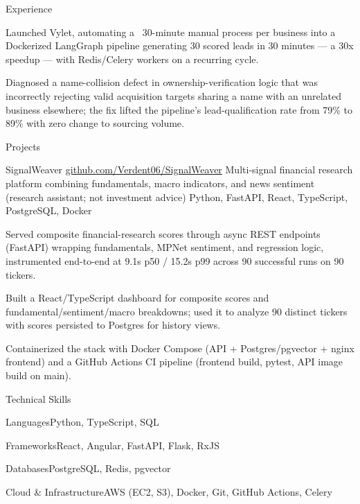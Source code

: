 \documentclass[
	11pt
]{../../../template}
\begin{document}
\begin{rSection}{E}{xperience}
\begin{rSectionEntry}
			\item Launched Vylet, automating a ~30-minute manual process per business into a Dockerized LangGraph pipeline generating 30 scored leads in 30 minutes --- a 30x speedup --- with Redis/Celery workers on a recurring cycle.
			\item Diagnosed a name-collision defect in ownership-verification logic that was incorrectly rejecting valid acquisition targets sharing a name with an unrelated business elsewhere; the fix lifted the pipeline's lead-qualification rate from 79\% to 89\% with zero change to sourcing volume.
		\end{rSectionEntry}
	\end{rSection}

	\begin{rSection}{P}{rojects}
		\begin{rSectionEntry}
			{SignalWeaver}
			{\href{https://github.com/Verdent06/SignalWeaver}{github.com/Verdent06/SignalWeaver}}
			{Multi-signal financial research platform combining fundamentals, macro indicators, and news sentiment (research assistant; not investment advice)}
			{Python, FastAPI, React, TypeScript, PostgreSQL, Docker}
			{}

			\item Served composite financial-research scores through async REST endpoints (FastAPI) wrapping fundamentals, MPNet sentiment, and regression logic, instrumented end-to-end at 9.1s p50 / 15.2s p99 across 90 successful runs on 90 tickers.
			\item Built a React/TypeScript dashboard for composite scores and fundamental/sentiment/macro breakdowns; used it to analyze 90 distinct tickers with scores persisted to Postgres for history views.
			\item Containerized the stack with Docker Compose (API + Postgres/pgvector + nginx frontend) and a GitHub Actions CI pipeline (frontend build, pytest, API image build on main).
		\end{rSectionEntry}
	\end{rSection}

	\begin{rSection}{T}{echnical Skills}
		\begin{rSet}{Languages}{Python, TypeScript, SQL}
		\end{rSet}
		\begin{rSet}{Frameworks}{React, Angular, FastAPI, Flask, RxJS}
		\end{rSet}
		\begin{rSet}{Databases}{PostgreSQL, Redis, pgvector}
		\end{rSet}
		\begin{rSet}{Cloud \& Infrastructure}{AWS (EC2, S3), Docker, Git, GitHub Actions, Celery}
		\end{rSet}
	\end{rSection}
\end{document}
